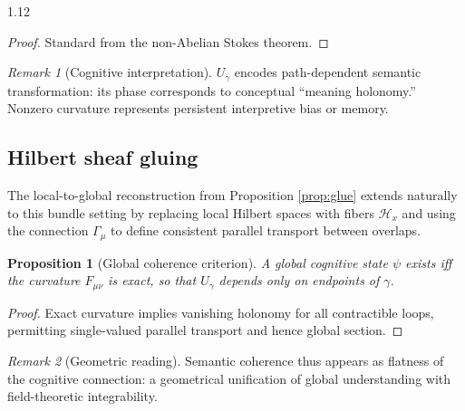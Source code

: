 \documentclass[12pt,a4paper]{article}
\numberwithin{equation}{section}
\newtheorem{proposition}{Proposition}[section]
\theoremstyle{remark}
\newtheorem{remark}{Remark}[section]
\theoremstyle{definition}
\begin{document}
\begin{spacing}{1.12}
\begin{proof}
Standard from the non-Abelian Stokes theorem.
\end{proof}

\begin{remark}[Cognitive interpretation]
$U_\gamma$ encodes path-dependent semantic transformation:
its phase corresponds to conceptual “meaning holonomy.”  
Nonzero curvature represents persistent interpretive bias or memory.
\end{remark}

\subsection*{Hilbert sheaf gluing}
The local-to-global reconstruction from Proposition \ref{prop:glue}
extends naturally to this bundle setting by replacing local Hilbert spaces
with fibers $\mathscr{H}_x$ and using the connection $\Gamma_\mu$
to define consistent parallel transport between overlaps.

\begin{proposition}[Global coherence criterion]
A global cognitive state $\psi$ exists
iff the curvature $F_{\mu\nu}$ is exact,
so that $U_\gamma$ depends only on endpoints of $\gamma$.
\end{proposition}

\begin{proof}
Exact curvature implies vanishing holonomy for all contractible loops,
permitting single-valued parallel transport and hence global section.
\end{proof}

\begin{remark}[Geometric reading]
Semantic coherence thus appears as flatness of the cognitive connection:
a geometrical unification of global understanding with field-theoretic integrability.
\end{remark}

\linespread{1.05}
\setlength{\parindent}{0pt}



\end{spacing}
\end{document}

